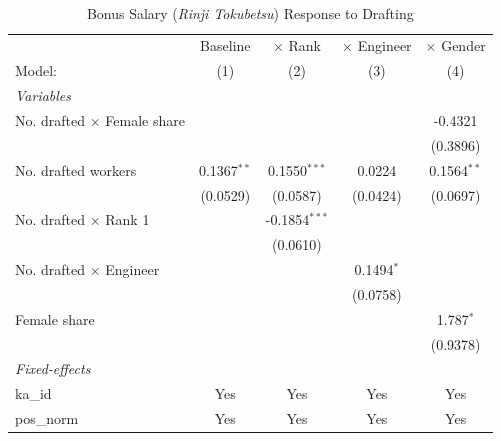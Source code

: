 \begin{table}[htbp]
\centering
\caption{Bonus Salary (\emph{Rinji Tokubetsu}) Response to Drafting}
\label{tab:rinji}
\begin{threeparttable}
 \\[4pt]
\begin{tabular}{lcccc}
   \tabularnewline \midrule \midrule
                                      & Baseline      & $\times$ Rank   & $\times$ Engineer  & $\times$ Gender \\    
   Model:                             & (1)           & (2)             & (3)                & (4)\\  
   \midrule
   \emph{Variables}\\
   No. drafted $\times$ Female share  &               &                 &                    & -0.4321\\   
                                      &               &                 &                    & (0.3896)\\   
   No. drafted workers                & 0.1367$^{**}$ & 0.1550$^{***}$  & 0.0224             & 0.1564$^{**}$\\   
                                      & (0.0529)      & (0.0587)        & (0.0424)           & (0.0697)\\   
   No. drafted $\times$ Rank 1        &               & -0.1854$^{***}$ &                    &   \\   
                                      &               & (0.0610)        &                    &   \\   
   No. drafted $\times$ Engineer      &               &                 & 0.1494$^{*}$       &   \\   
                                      &               &                 & (0.0758)           &   \\   
   Female share                       &               &                 &                    & 1.787$^{*}$\\   
                                      &               &                 &                    & (0.9378)\\   
   \midrule
   \emph{Fixed-effects}\\
   ka\_id                             & Yes           & Yes             & Yes                & Yes\\  
   pos\_norm                          & Yes           & Yes             & Yes                & Yes\\  

\end{tabular}
\end{threeparttable}
\end{table}

